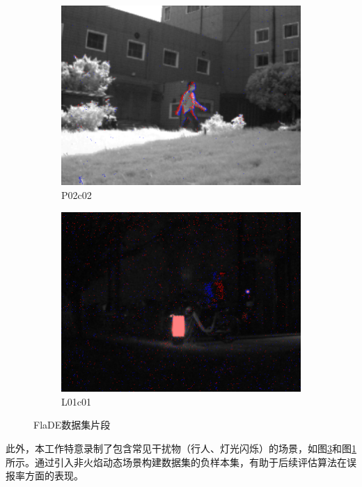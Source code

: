 \begin{figure}[ht]
\begin{subfigure}{0.32\textwidth}
        \includegraphics[width=\textwidth]{figures/FlaDE_05.png}
        \caption{P02\textunderscore c02}
        \label{subfig:FlaDE_06}
    \end{subfigure}
    \hfill
    \begin{subfigure}{0.32\textwidth}
        \centering
        \includegraphics[width=\textwidth]{figures/FlaDE_06.png}
        \caption{L01\textunderscore c01}
        \label{subfig:FlaDE_05}
    \end{subfigure}
    \caption{FlaDE数据集片段}
\end{figure}

此外，本工作特意录制了包含常见干扰物（行人、灯光闪烁）的场景，如图\ref{subfig:FlaDE_05}和图\ref{subfig:FlaDE_06}所示。通过引入非火焰动态场景构建数据集的负样本集，有助于后续评估算法在误报率方面的表现。


